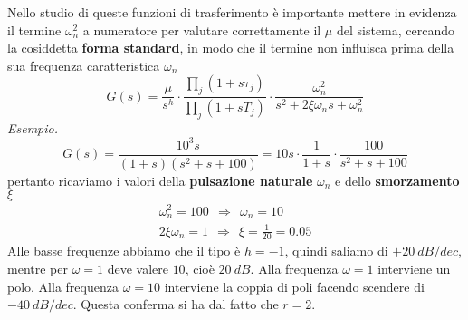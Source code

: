 \documentclass[10pt,a4paper]{book}
\begin{document}
\begin{figure}[htpb]
\end{figure}\FloatBarrier

Nello studio di queste funzioni di trasferimento è importante mettere in evidenza il termine $\omega ^{2}_{n}$ a numeratore per valutare correttamente il $\mu $ del sistema, cercando la cosiddetta \textbf{forma standard}, in modo che il termine non influisca prima della sua frequenza caratteristica $\omega _{n}$
\begin{equation*}
\boxed{G( s) =\frac{\mu }{s^{h}} \cdot \frac{\prod _{j}( 1+s\tau _{j})}{\prod _{j}( 1+sT_{j})} \cdot \frac{\omega ^{2}_{n}}{s^{2} +2\xi \omega _{n} s+\omega ^{2}_{n}}}
\end{equation*}
\textit{Esempio.}
\begin{equation*}
G( s) =\frac{10^{3} s}{( 1+s)\left( s^{2} +s+100\right)} =10s\cdot \frac{1}{1+s} \cdot \frac{100}{s^{2} +s+100}
\end{equation*}
pertanto ricaviamo i valori della \textbf{pulsazione naturale} $\omega _{n}$ e dello \textbf{smorzamento} $\xi $
\begin{gather*}
\omega ^{2}_{n} =100\ \ \Rightarrow \ \ \omega _{n} =10\\
2\xi \omega _{n} =1\ \ \Rightarrow \ \ \xi =\frac{1}{20} =0.05
\end{gather*}
Alle basse frequenze abbiamo che il tipo è $h=-1$, quindi saliamo di $+20\ \si{dB/dec}$, mentre per $\omega =1$ deve valere $10$, cioè $20\ \si{dB}$. Alla frequenza $\omega =1$ interviene un polo. Alla frequenza $\omega =10$ interviene la coppia di poli facendo scendere di $-40\ \si{dB/dec}$. Questa conferma si ha dal fatto che $r=2$.
\end{document}
